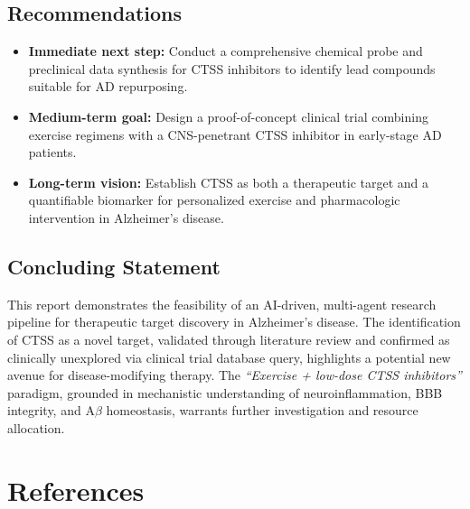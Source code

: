 \documentclass[11pt, a4paper]{article}
\begin{document}
\subsection{Recommendations}

\begin{itemize}
    \item \textbf{Immediate next step:} Conduct a comprehensive chemical probe and preclinical data synthesis for CTSS inhibitors to identify lead compounds suitable for AD repurposing.
    \item \textbf{Medium-term goal:} Design a proof-of-concept clinical trial combining exercise regimens with a CNS-penetrant CTSS inhibitor in early-stage AD patients.
    \item \textbf{Long-term vision:} Establish CTSS as both a therapeutic target and a quantifiable biomarker for personalized exercise and pharmacologic intervention in Alzheimer's disease.
\end{itemize}

\subsection{Concluding Statement}

This report demonstrates the feasibility of an AI-driven, multi-agent research pipeline for therapeutic target discovery in Alzheimer's disease. The identification of CTSS as a novel target, validated through literature review and confirmed as clinically unexplored via clinical trial database query, highlights a potential new avenue for disease-modifying therapy. The \textit{``Exercise + low-dose CTSS inhibitors''} paradigm, grounded in mechanistic understanding of neuroinflammation, BBB integrity, and A$\beta$ homeostasis, warrants further investigation and resource allocation.

\section*{References}
\end{document}
